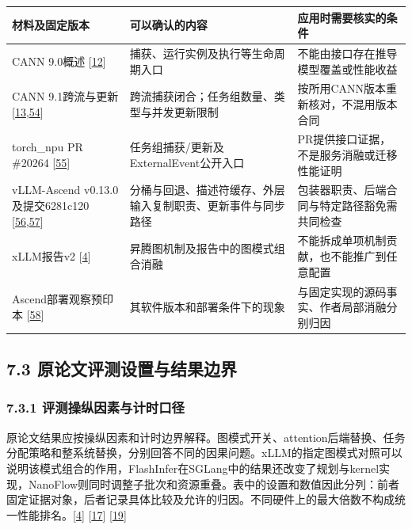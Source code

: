 \documentclass[
  11pt,
  UTF8]{ctexart}
\begin{document}
\begin{longtable}[]{@{}
  >{\raggedright\arraybackslash}p{}
  >{\raggedright\arraybackslash}p{}
  >{\raggedright\arraybackslash}p{}@{}}
\toprule
材料及固定版本 & 可以确认的内容 & 应用时需要核实的条件 \\
\midrule
\endhead
CANN 9.0概述 {[}\protect\hyperlink{ref-cann900overview}{12}{]} &
捕获、运行实例及执行等生命周期入口 &
不能由接口存在推导模型覆盖或性能收益 \\
CANN 9.1跨流与更新
{[}\protect\hyperlink{ref-cann910update}{13},\protect\hyperlink{ref-cann910multi}{54}{]}
& 跨流捕获闭合；任务组数量、类型与并发更新限制 &
按所用CANN版本重新核对，不混用版本合同 \\
torch\_npu PR \#20264 {[}\protect\hyperlink{ref-gitee20264}{55}{]} &
任务组捕获/更新及ExternalEvent公开入口 &
PR提供接口证据，不是服务消融或迁移性能证明 \\
vLLM-Ascend v0.13.0及提交6281c120
{[}\protect\hyperlink{ref-vllmascend0130}{56},\protect\hyperlink{ref-vllmascend0130impl}{57}{]}
& 分桶与回退、描述符缓存、外层输入复制职责、更新事件与同步路径 &
包装器职责、后端合同与特定路径豁免需共同检查 \\
xLLM报告v2 {[}\protect\hyperlink{ref-liu2025xllm}{4}{]} &
昇腾图机制及报告中的图模式组合消融 &
不能拆成单项机制贡献，也不能推广到任意配置 \\
Ascend部署观察预印本 {[}\protect\hyperlink{ref-yu2026ascendfield}{58}{]}
& 其软件版本和部署条件下的现象 &
与固定实现的源码事实、作者局部消融分别归因 \\
\bottomrule
\end{longtable}

\hypertarget{section-7-3}{%
\subsection{7.3 原论文评测设置与结果边界}\label{section-7-3}}

\hypertarget{section-7-3-1}{%
\subsubsection{7.3.1 评测操纵因素与计时口径}\label{section-7-3-1}}

原论文结果应按操纵因素和计时边界解释。图模式开关、attention后端替换、任务分配策略和整系统替换，分别回答不同的因果问题。xLLM的指定图模式对照可以说明该模式组合的作用，FlashInfer在SGLang中的结果还改变了规划与kernel实现，NanoFlow则同时调整子批次和资源重叠。表中的设置和数值因此分列：前者固定证据对象，后者记录具体比较及允许的归因。不同硬件上的最大倍数不构成统一性能排名。{[}\protect\hyperlink{ref-liu2025xllm}{4}{]}
{[}\protect\hyperlink{ref-ye2025flashinfer}{17}{]}
{[}\protect\hyperlink{ref-zhu2025nanoflow}{19}{]}
\end{document}
